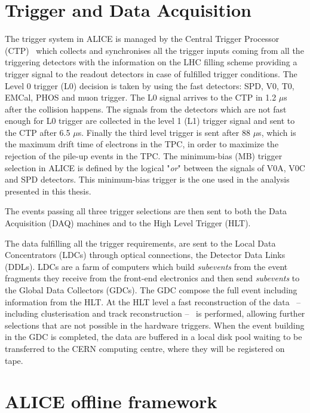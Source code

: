 %
%
\section{Trigger and Data Acquisition} \label{sec:data_flow}

The trigger system in ALICE is managed by the Central Trigger Processor (CTP)~\cite{alice_trigger} 
which collects and synchronises all the trigger inputs coming from all the triggering detectors 
with the information on the LHC filling scheme providing a trigger signal to the readout detectors
in case of fulfilled trigger conditions. 
The Level 0 trigger (L0) decision is taken by using the fast detectors: SPD, V0, T0, EMCal, PHOS and 
muon trigger. The L0 signal arrives to the CTP in 1.2 $\mu$s after the collision happens. 
The signals from the detectors which are not fast enough for L0 trigger are collected in the level 1
(L1) trigger signal and sent to the CTP after 6.5 $\mu$s. 
Finally the third level trigger is sent after 88 $\mu$s, which is the maximum drift time of electrons
in the TPC, in order to maximize the rejection of the pile-up events in the TPC.
The minimum-bias (MB) trigger  selection in ALICE is defined by the logical "\textit{or}" between the
signals of V0A, V0C and SPD detectors. This minimum-bias trigger is the one used in the analysis
presented in this thesis.

The events passing all three trigger selections are then sent to both the Data Acquisition (DAQ) machines 
and to the High Level Trigger (HLT).


The data fulfilling all the trigger requirements, are sent to the Local Data Concentrators (LDCs)
through optical connections, the Detector Data Links (DDLs).
LDCs are a farm of computers which build \textit{subevents} from the event fragments they receive from
the front-end electronics and then send \textit{subevents} to the Global Data Collectors (GDCs).
The GDC compose the full event including information from the HLT.
At the HLT level a fast reconstruction of the data \ -- including clusterisation and track
reconstruction -- \ is performed, allowing further selections that are not possible in the hardware
triggers.
When the event building in the GDC is completed, the data are buffered in a local disk pool waiting 
to be transferred to the CERN computing centre, where they will be registered on tape.

%
%
\section{ALICE offline framework} \label{sec:offline}

